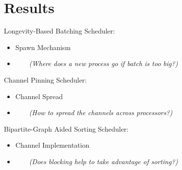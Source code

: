 \section{Results}

\begin{slide}
    Longevity-Based Batching Scheduler:
    \begin{itemize}
    \item Spawn Mechanism 
    \item[] ~~~~{\it (Where does a new process go if batch is too big?)}
    \end{itemize}
    
    Channel Pinning Scheduler:
    \begin{itemize}
    \item Channel Spread 
    \item[] ~~~~{\it (How to spread the channels across processors?)}
    \end{itemize}

    Bipartite-Graph Aided Sorting Scheduler:
    \begin{itemize}
    \item Channel Implementation 
    \item[] ~~~~{\it (Does blocking help to take advantage of sorting?)}
    \end{itemize}

\end{slide}

